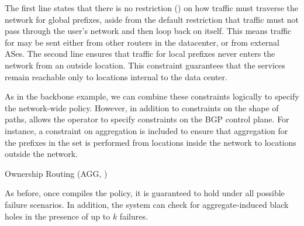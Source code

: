 The first line states that there is no restriction (\Any)
on how traffic must
traverse the network for global prefixes, aside from the default restriction
that traffic must not pass through the user's network and then loop
back on itself. This means traffic for
 may be sent either from other routers in the datacenter, or
from external ASes. The second line ensures that traffic for local
prefixes never enters the network from an outside location. This constraint
guarantees that the services remain reachable only to locations
internal to the data center.

As in the backbone example, we can combine these constraints
logically to specify the network-wide policy.
However, in addition to constraints on the shape of paths,
\sysname allows the operator to specify constraints on the BGP control plane.
For instance, a constraint on aggregation is included to ensure that
aggregation for the prefixes in the set  is performed from 
locations inside the network
to locations outside the network. 

\begin{code}
Ownership \AND{} Routing \AND{} \Agg(AGG, \In \Link \Out)
\end{code}

As before, once \sysname compiles the policy, it is guaranteed to hold under
all possible failure scenarios. In addition, the system can check for
aggregate-induced black holes in the presence of up to $k$ failures.









